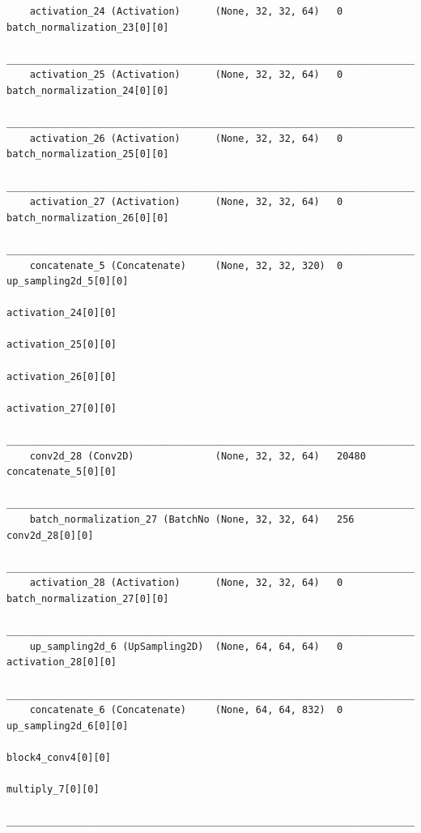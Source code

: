 {\begin{verbatim}
    activation_24 (Activation)      (None, 32, 32, 64)   0           batch_normalization_23[0][0]     
    __________________________________________________________________________________________________
    activation_25 (Activation)      (None, 32, 32, 64)   0           batch_normalization_24[0][0]     
    __________________________________________________________________________________________________
    activation_26 (Activation)      (None, 32, 32, 64)   0           batch_normalization_25[0][0]     
    __________________________________________________________________________________________________
    activation_27 (Activation)      (None, 32, 32, 64)   0           batch_normalization_26[0][0]     
    __________________________________________________________________________________________________
    concatenate_5 (Concatenate)     (None, 32, 32, 320)  0           up_sampling2d_5[0][0]            
                                                                        activation_24[0][0]              
                                                                        activation_25[0][0]              
                                                                        activation_26[0][0]              
                                                                        activation_27[0][0]              
    __________________________________________________________________________________________________
    conv2d_28 (Conv2D)              (None, 32, 32, 64)   20480       concatenate_5[0][0]              
    __________________________________________________________________________________________________
    batch_normalization_27 (BatchNo (None, 32, 32, 64)   256         conv2d_28[0][0]                  
    __________________________________________________________________________________________________
    activation_28 (Activation)      (None, 32, 32, 64)   0           batch_normalization_27[0][0]     
    __________________________________________________________________________________________________
    up_sampling2d_6 (UpSampling2D)  (None, 64, 64, 64)   0           activation_28[0][0]              
    __________________________________________________________________________________________________
    concatenate_6 (Concatenate)     (None, 64, 64, 832)  0           up_sampling2d_6[0][0]            
                                                                        block4_conv4[0][0]               
                                                                        multiply_7[0][0]                 
    __________________________________________________________________________________________________

\end{verbatim}}
